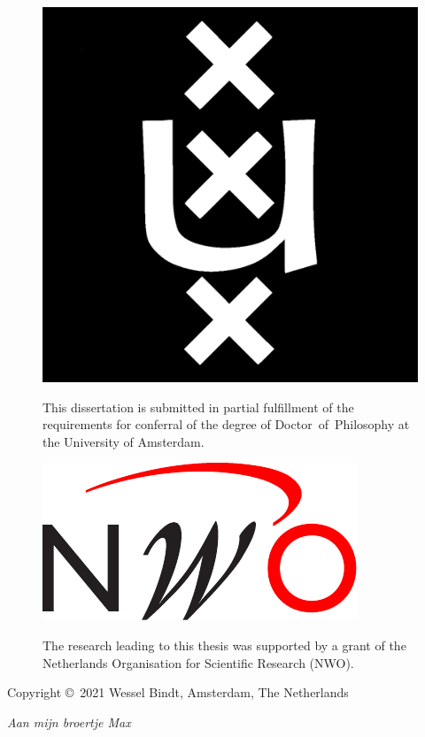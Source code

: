 {\pagestyle{empty}
\begin{figure}[!h]
   \begin{minipage}[c][2.0cm]{0.3\textwidth}
      \vspace{0pt}
      \centering\includegraphics[width=0.65\linewidth]{assets/University_of_Amsterdam_logo.eps}
   \end{minipage}
   \hfill
   \begin{minipage}[c][2.0cm]{0.65\textwidth}
      \vspace{0pt}%
	This dissertation is submitted in partial fulfillment of the requirements for conferral of the degree of \mbox{Doctor of Philosophy} at the University of \mbox{Amsterdam}.
   \end{minipage}
\end{figure}
%
\begin{figure}[!h]
   \begin{minipage}[c][2.0cm]{0.3\textwidth}
      \vspace{0pt}
       \centering\includegraphics[width=0.9\linewidth]{assets/NWO_logo.pdf}
   \end{minipage}
   \hfill
   \begin{minipage}[c][2.0cm]{0.65\textwidth}
      \vspace{0pt}%
    The research leading to this thesis was supported by a grant of the
    Netherlands Organisation for Scientific Research (NWO). \end{minipage}
\end{figure}
%
\vfill

\noindent
Copyright \copyright~2021 Wessel Bindt, Amsterdam, The Netherlands\\

\newpage
\begin{center}
    \thispagestyle{empty}
    \vspace*{20pt}
    {\large {\it Aan mijn broertje Max}}
    \vspace*{\fill}
\end{center}
}
